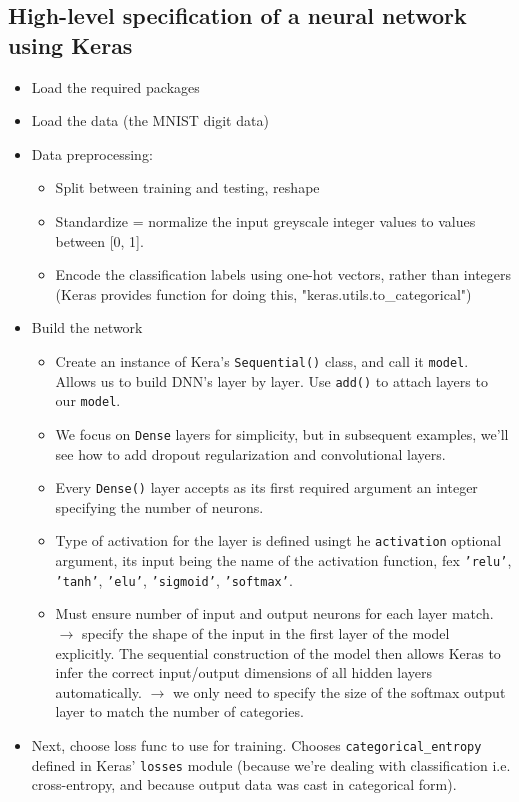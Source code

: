 \documentclass[norsk,a4paper,11pt]{article}
\begin{document}
\subsection{High-level specification of a neural network using Keras}
\begin{itemize}
	\item Load the required packages
	\item Load the data (the MNIST digit data)
	\item Data preprocessing:
	\begin{itemize}
		\item Split between training and testing, reshape
		\item Standardize = normalize the input greyscale integer values to values between [0, 1]. 
		\item Encode the classification labels using one-hot vectors, rather than integers (Keras provides function for doing this, "keras.utils.to\_categorical")
	\end{itemize}
	\item Build the network
	\begin{itemize}
		\item Create an instance of Kera's \texttt{Sequential()} class, and call it \texttt{model}. Allows us to build DNN's layer by layer. Use \texttt{add()} to attach layers to our \texttt{model}.
		\item We focus on \texttt{Dense} layers for simplicity, but in subsequent examples, we'll see how to add dropout regularization and convolutional layers.
		\item Every \texttt{Dense()} layer accepts as its first required argument an integer specifying the number of neurons. 
		\item Type of activation for the layer is defined usingt he \texttt{activation} optional argument, its input being the name of the activation function, fex \texttt{'relu'}, \texttt{'tanh'}, \texttt{'elu'}, \texttt{'sigmoid'}, \texttt{'softmax'}.
		\item Must ensure number of input and output neurons for each layer match. $\rightarrow$ specify the shape of the input in the first layer of the model explicitly. The sequential construction of the model then allows Keras to infer the correct input/output dimensions of all hidden layers automatically. $\rightarrow$ we only need to specify the size of the softmax output layer to match the number of categories. 
	\end{itemize}
	\item Next, choose loss func to use for training. Chooses \texttt{categorical\_entropy} defined in Keras' \texttt{losses} module (because we're dealing with classification i.e. cross-entropy, and because output data was cast in categorical form).

\end{itemize}
\end{document}
